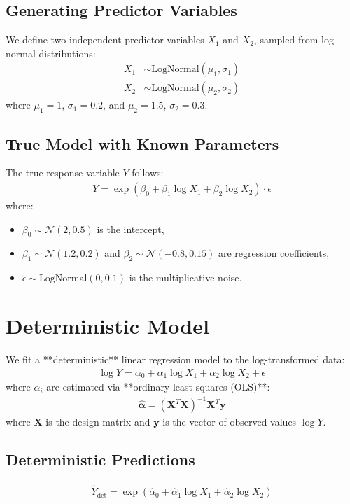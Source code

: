 \documentclass{article}
\begin{document}
\subsection{Generating Predictor Variables}
We define two independent predictor variables $X_1$ and $X_2$, sampled from log-normal distributions:
\begin{align}
    X_1 &\sim \text{LogNormal}(\mu_1, \sigma_1) \\
    X_2 &\sim \text{LogNormal}(\mu_2, \sigma_2)
\end{align}
where $\mu_1 = 1$, $\sigma_1 = 0.2$, and $\mu_2 = 1.5$, $\sigma_2 = 0.3$.

\subsection{True Model with Known Parameters}
The true response variable $Y$ follows:
\begin{align}
    Y = \exp \left( \beta_0 + \beta_1 \log X_1 + \beta_2 \log X_2 \right) \cdot \epsilon
\end{align}
where:
\begin{itemize}
    \item $\beta_0 \sim \mathcal{N}(2, 0.5)$ is the intercept,
    \item $\beta_1 \sim \mathcal{N}(1.2, 0.2)$ and $\beta_2 \sim \mathcal{N}(-0.8, 0.15)$ are regression coefficients,
    \item $\epsilon \sim \text{LogNormal}(0, 0.1)$ is the multiplicative noise.
\end{itemize}

\section{Deterministic Model}
We fit a **deterministic** linear regression model to the log-transformed data:
\begin{align}
    \log Y = \alpha_0 + \alpha_1 \log X_1 + \alpha_2 \log X_2 + \epsilon
\end{align}
where $\alpha_i$ are estimated via **ordinary least squares (OLS)**:
\begin{align}
    \hat{\boldsymbol{\alpha}} = (\mathbf{X}^T \mathbf{X})^{-1} \mathbf{X}^T \mathbf{y}
\end{align}
where $\mathbf{X}$ is the design matrix and $\mathbf{y}$ is the vector of observed values $\log Y$.

\subsection{Deterministic Predictions}
\begin{align}
    \hat{Y}_{\text{det}} = \exp (\hat{\alpha}_0 + \hat{\alpha}_1 \log X_1 + \hat{\alpha}_2 \log X_2)
\end{align}
\end{document}
